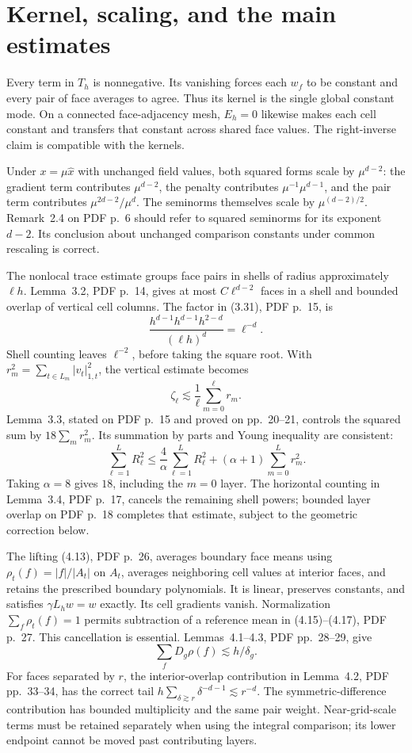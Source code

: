 \documentclass[10pt]{article}
\begin{document}
\section*{Kernel, scaling, and the main estimates}
Every term in \(T_h\) is nonnegative. Its vanishing forces each \(w_f\) to be constant and every pair of face averages to agree. Thus its kernel is the single global constant mode. On a connected face-adjacency mesh, \(E_h=0\) likewise makes each cell constant and transfers that constant across shared face values. The right-inverse claim is compatible with the kernels.\par
Under \(x=\mu\widehat x\) with unchanged field values, both squared forms scale by \(\mu^{d-2}\): the gradient term contributes \(\mu^{d-2}\), the penalty contributes \(\mu^{-1}\mu^{d-1}\), and the pair term contributes \(\mu^{2d-2}/\mu^d\). The seminorms themselves scale by \(\mu^{(d-2)/2}\). Remark 2.4 on PDF p. 6 should refer to squared seminorms for its exponent \(d-2\). Its conclusion about unchanged comparison constants under common rescaling is correct.\par
The nonlocal trace estimate groups face pairs in shells of radius approximately \(\ell h\). Lemma 3.2, PDF p. 14, gives at most \(C\ell^{d-2}\) faces in a shell and bounded overlap of vertical cell columns. The factor in (3.31), PDF p. 15, is \[\frac{h^{d-1}h^{d-1}h^{2-d}}{(\ell h)^d}=\ell^{-d}.\] Shell counting leaves \(\ell^{-2}\), before taking the square root. With \(r_m^2=\sum_{t\in L_m}|v_t|_{1,t}^2\), the vertical estimate becomes \[\zeta_\ell\lesssim\frac1\ell\sum_{m=0}^{\ell}r_m.\] Lemma 3.3, stated on PDF p. 15 and proved on pp. 20–21, controls the squared sum by \(18\sum_mr_m^2\). Its summation by parts and Young inequality are consistent: \[\sum_{\ell=1}^L R_\ell^2
 \le\frac4\alpha\sum_{\ell=1}^L R_\ell^2
       +(\alpha+1)\sum_{m=0}^Lr_m^2.\] Taking \(\alpha=8\) gives \(18\), including the \(m=0\) layer. The horizontal counting in Lemma 3.4, PDF p. 17, cancels the remaining shell powers; bounded layer overlap on PDF p. 18 completes that estimate, subject to the geometric correction below.\par
The lifting (4.13), PDF p. 26, averages boundary face means using \(\rho_t(f)=|f|/|A_t|\) on \(A_t\), averages neighboring cell values at interior faces, and retains the prescribed boundary polynomials. It is linear, preserves constants, and satisfies \(\gamma L_hw=w\) exactly. Its cell gradients vanish. Normalization \(\sum_f\rho_t(f)=1\) permits subtraction of a reference mean in (4.15)–(4.17), PDF p. 27. This cancellation is essential. Lemmas 4.1–4.3, PDF pp. 28–29, give \[\sum_fD_g\rho(f)\lesssim h/\delta_g.\] For faces separated by \(r\), the interior-overlap contribution in Lemma 4.2, PDF pp. 33–34, has the correct tail \(h\sum_{\delta\gtrsim r}\delta^{-d-1}\lesssim r^{-d}\). The symmetric-difference contribution has bounded multiplicity and the same pair weight. Near-grid-scale terms must be retained separately when using the integral comparison; its lower endpoint cannot be moved past contributing layers.\par
\end{document}
